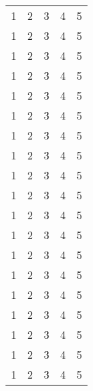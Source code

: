 \documentclass{article}
\begin{document}
\begin{longtable}{lllll}
    1        & 2        & 3        & 4        & 5               \\

    1        & 2        & 3        & 4        & 5               \\

    1        & 2        & 3        & 4        & 5               \\

    1        & 2        & 3        & 4        & 5               \\

    1        & 2        & 3        & 4        & 5               \\

    1        & 2        & 3        & 4        & 5               \\

    1        & 2        & 3        & 4        & 5               \\

    1        & 2        & 3        & 4        & 5               \\

    1        & 2        & 3        & 4        & 5               \\

    1        & 2        & 3        & 4        & 5               \\

    1        & 2        & 3        & 4        & 5               \\

    1        & 2        & 3        & 4        & 5               \\

    1        & 2        & 3        & 4        & 5               \\

    1        & 2        & 3        & 4        & 5               \\

    1        & 2        & 3        & 4        & 5               \\

    1        & 2        & 3        & 4        & 5               \\

    1        & 2        & 3        & 4        & 5               \\

    1        & 2        & 3        & 4        & 5               \\
    1        & 2        & 3        & 4        & 5               \\


\end{longtable}
\end{document}
